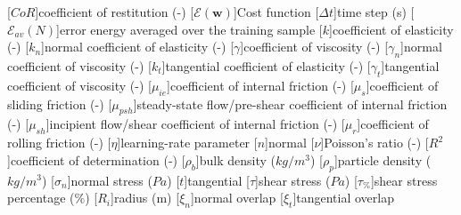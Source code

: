 \begin{multicols}{2}
\begin{acronym}[FOOBAR]
	[$CoR$]{coefficient of restitution (-)}
	[$\mathscr{E}(\mathbf{w})$]{Cost function}
	[$\Delta t$]{time step (s)}
	[$\mathscr{E}_{av}(N)$]{error energy averaged over the training
	sample}
	[$k$]{coefficient of elasticity (-)}
	[$k_n$]{normal coefficient of elasticity (-)}
	[$\gamma$]{coefficient of viscosity (-)}	
	[$\gamma_n$]{normal coefficient of viscosity (-)}
	[$k_t$]{tangential coefficient of elasticity (-)}
	[$\gamma_t$]{tangential coefficient of viscosity (-)}	
	[$\mu_{ie}$]{coefficient of internal friction (-)} 
	[$\mu_s$]{coefficient of sliding friction (-)}
	[$\mu_{psh}$]{steady-state flow/pre-shear coefficient of internal
	friction (-)} 
	[$\mu_{sh}$]{incipient flow/shear coefficient of internal
	friction (-)}
	[$\mu_r$]{coefficient of rolling friction (-)}
	[$\eta$]{learning-rate parameter}
	[$n$]{normal}
	[$\nu$]{Poisson's ratio (-)}
	[$R^2$]{coefficient of determination (-)}
	[$\rho_b$]{bulk density ($kg/m^3$)}
	[$\rho_p$]{particle density ($kg/m^3$)}
	[$\sigma_n$]{normal stress ($Pa$)}
	[$t$]{tangential}
	[$\tau$]{shear stress ($Pa$)}
	[$\tau_{\%}$]{shear stress percentage ($\%$)}
	[$R_i$]{radius (m)}
	[$\xi_n$]{normal overlap}
	[$\xi_t$]{tangential overlap}

% 	
\end{acronym}
\end{multicols}
